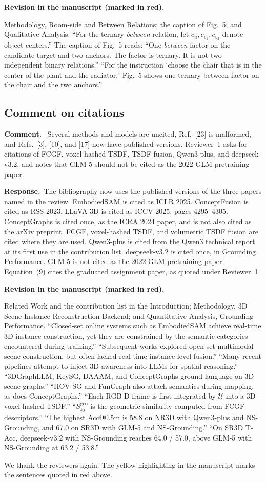 \documentclass[11pt]{article}
\newcommand{\revcomment}[1]{%
  \par\vspace{0.6em}\noindent\textcolor{revblue}{\textbf{Comment.}}\ %
  \textcolor{revblue}{#1}\par\vspace{0.4em}}
\newcommand{\revresponse}[1]{%
  \par\noindent\textbf{Response.}\ #1\par\vspace{0.3em}}
\newcommand{\revchange}[1]{%
  \par\noindent\textbf{Revision in the manuscript (marked in red).}\par
  \noindent\textcolor{revred}{#1}\par\vspace{0.8em}}
\begin{document}
\revchange{Methodology, Room-side and Between Relations; the caption of Fig.~5; and Qualitative Analysis. ``For the ternary \emph{between} relation, let \(c_u,c_{v_1},c_{v_2}\) denote object centers.'' The caption of Fig.~5 reads: ``One \emph{between} factor on the candidate target and two anchors. The factor is ternary. It is not two independent binary relations.'' ``For the instruction `choose the chair that is in the center of the plant and the radiator,' Fig.~5 shows one ternary between factor on the chair and the two anchors.''}

\subsection*{Comment on citations}

\revcomment{Several methods and models are uncited, Ref.~[23] is malformed, and Refs.~[3], [10], and [17] now have published versions. Reviewer~1 asks for citations of FCGF, voxel-hashed TSDF, TSDF fusion, Qwen3-plus, and deepseek-v3.2, and notes that GLM-5 should not be cited as the 2022 GLM pretraining paper.}

\revresponse{The bibliography now uses the published versions of the three papers named in the review. EmbodiedSAM is cited as ICLR 2025. ConceptFusion is cited as RSS 2023. LLaVA-3D is cited as ICCV 2025, pages 4295--4305. ConceptGraphs is cited once, as the ICRA 2024 paper, and is not also cited as the arXiv preprint. FCGF, voxel-hashed TSDF, and volumetric TSDF fusion are cited where they are used. Qwen3-plus is cited from the Qwen3 technical report at its first use in the contribution list. deepseek-v3.2 is cited once, in Grounding Performance. GLM-5 is not cited as the 2022 GLM pretraining paper. Equation~(9) cites the graduated assignment paper, as quoted under Reviewer~1.}

\revchange{Related Work and the contribution list in the Introduction; Methodology, 3D Scene Instance Reconstruction Backend; and Quantitative Analysis, Grounding Performance. ``Closed-set online systems such as EmbodiedSAM achieve real-time 3D instance construction, yet they are constrained by the semantic categories encountered during training.'' ``Subsequent works explored open-set multimodal scene construction, but often lacked real-time instance-level fusion.'' ``Many recent pipelines attempt to inject 3D awareness into LLMs for spatial reasoning.'' ``3DGraphLLM, KeySG, DAAAM, and ConceptGraphs ground language on 3D scene graphs.'' ``HOV-SG and FunGraph also attach semantics during mapping, as does ConceptGraphs.'' ``Each RGB-D frame is first integrated by \(\mathcal{U}\) into a 3D voxel-hashed TSDF.'' ``\(S^{\mathrm{geo}}_{kj}\) is the geometric similarity computed from FCGF descriptors.'' ``The highest Acc@0.5m is 58.8 on NR3D with Qwen3-plus and NS-Grounding, and 67.0 on SR3D with GLM-5 and NS-Grounding.'' ``On SR3D T-Acc, deepseek-v3.2 with NS-Grounding reaches 64.0 / 57.0, above GLM-5 with NS-Grounding at 63.2 / 53.8.''}

\bigskip
\noindent We thank the reviewers again. The yellow highlighting in the manuscript marks the sentences quoted in red above.
\end{document}
